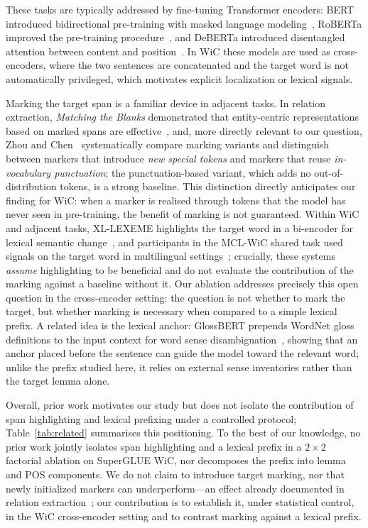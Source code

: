 \documentclass[runningheads]{llncs}
\begin{document}
These tasks are typically addressed by fine-tuning Transformer encoders: BERT
introduced bidirectional pre-training with masked language
modeling~\cite{devlin2019bert}, RoBERTa improved the pre-training
procedure~\cite{liu2019roberta}, and DeBERTa introduced disentangled attention
between content and position~\cite{he2021deberta}. In WiC these models are used
as cross-encoders, where the two sentences are concatenated and the target word
is not automatically privileged, which motivates explicit localization or
lexical signals.

Marking the target span is a familiar device in adjacent tasks. In relation
extraction, \emph{Matching the Blanks} demonstrated that entity-centric
representations based on marked spans are effective~\cite{soares2019matching},
and, more directly relevant to our question, Zhou and
Chen~\cite{zhou2022improved} systematically compare marking variants and
distinguish between markers that introduce \emph{new special tokens} and markers
that reuse \emph{in-vocabulary punctuation}; the punctuation-based variant, which
adds no out-of-distribution tokens, is a strong baseline. This distinction
directly anticipates our finding for WiC: when a marker is realised through
tokens that the model has never seen in pre-training, the benefit of marking is
not guaranteed. Within WiC and adjacent tasks, XL-LEXEME highlights the target
word in a bi-encoder for lexical semantic change~\cite{cassotti2023xllexeme}, and
participants in the MCL-WiC shared task used signals on the target word in
multilingual settings~\cite{martelli2021mclwic,gupta2021mcliitk}; crucially,
these systems \emph{assume} highlighting to be beneficial and do not evaluate the
contribution of the marking against a baseline without it. Our ablation addresses
precisely this open question in the cross-encoder setting: the question is not
whether to mark the target, but whether marking is necessary when compared to a
simple lexical prefix. A related idea is the lexical anchor: GlossBERT prepends
WordNet gloss definitions to the input context for word sense
disambiguation~\cite{huang2019glossbert}, showing that an anchor placed before
the sentence can guide the model toward the relevant word; unlike the prefix
studied here, it relies on external sense inventories rather than the target
lemma alone.

Overall, prior work motivates our study but does not isolate the contribution of
span highlighting and lexical prefixing under a controlled protocol;
Table~\ref{tab:related} summarises this positioning. To the best of our
knowledge, no prior work jointly isolates span highlighting and a lexical prefix
in a $2 \times 2$ factorial ablation on SuperGLUE WiC, nor decomposes the prefix
into lemma and POS components. We do not claim to introduce target marking, nor
that newly initialized markers can underperform---an effect already documented
in relation extraction~\cite{zhou2022improved}; our contribution is to establish
it, under statistical control, in the WiC cross-encoder setting and to contrast
marking against a lexical prefix.
\end{document}
